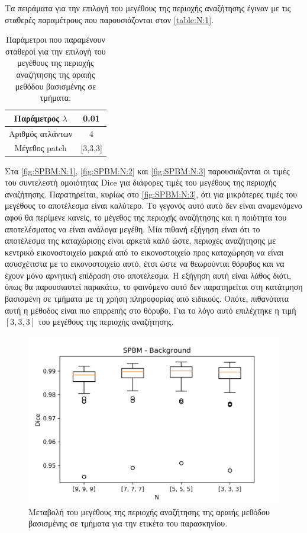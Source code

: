 \documentclass[a4paper,12pt]{article}
\begin{document}
Τα πειράματα για την επιλογή του μεγέθους της περιοχής αναζήτησης έγιναν με τις
σταθερές παραμέτρους που παρουσιάζονται στον \autoref{table:N:1}.

\begin{table}[h!]
    \centering
    \begin{tabular}{|c|c|} 
        \hline
        Παράμετρος $\lambda$ & 0.01 \\ 
        \hline
        Αριθμός ατλάντων & 4 \\ 
        \hline
        Μέγεθος patch & [3,3,3] \\ 
        \hline
    \end{tabular}
    \caption{Παράμετροι που παραμένουν σταθεροί για την επιλογή του μεγέθους της
             περιοχής αναζήτησης της αραιής μεθόδου βασισμένης σε τμήματα.}
    \label{table:N:1}
\end{table}

Στα \autoref{fig:SPBM:N:1}, \autoref{fig:SPBM:N:2} και \autoref{fig:SPBM:N:3}
παρουσιάζονται οι τιμές του συντελεστή ομοιότητας Dice για διάφορες τιμές του
μεγέθους της περιοχής αναζήτησης. Παρατηρείται, κυρίως στο
\autoref{fig:SPBM:N:3}, ότι για μικρότερες τιμές του μεγέθους το αποτέλεσμα
είναι καλύτερο. Το γεγονός αυτό αυτό δεν είναι αναμενόμενο αφού θα περίμενε
κανείς, το μέγεθος της περιοχής αναζήτησης και η ποιότητα του αποτελέσματος να
είναι ανάλογα μεγέθη. Μία πιθανή εξήγηση είναι ότι το αποτέλεσμα της καταχώρισης
είναι αρκετά καλό ώστε, περιοχές αναζήτησης με κεντρικό εικονοστοιχείο μακριά
από το εικονοστοιχείο προς καταχώρηση να είναι ασυσχέτιστα με το εικονοστοιχείο
αυτό, έτσι ώστε να θεωρούνται θόρυβος και να έχουν μόνο αρνητική επίδραση στο
αποτέλεσμα. Η εξήγηση αυτή είναι λάθος διότι, όπως θα παρουσιαστεί παρακάτω, το
φαινόμενο αυτό δεν παρατηρείται στη κατάτμηση βασισμένη σε τμήματα με τη χρήση
πληροφορίας από ειδικούς. Οπότε, πιθανότατα αυτή η μέθοδος είναι πιο επιρρεπής
στο θόρυβο. Για το λόγο αυτό επιλέχτηκε η τιμή $[3,3,3]$ του μεγέθους της
περιοχής αναζήτησης.


\begin{figure}[H]
    \centering
    \includegraphics[width=0.85\linewidth]{SPBM_N_Background_plot.png}
    \caption{Μεταβολή του μεγέθους της περιοχής αναζήτησης της αραιής μεθόδου
             βασισμένης σε τμήματα για την ετικέτα του παρασκηνίου.}
    \label{fig:SPBM:N:1}
\end{figure}
\end{document}
